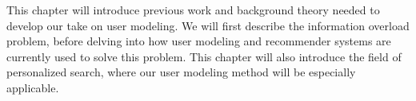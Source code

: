 \label{chap:theory}

This chapter will introduce previous work and background theory needed to develop our take on user modeling.
We will first describe the information overload problem, before delving into
how user modeling and recommender systems are currently used to solve this problem.
This chapter will also introduce the field of personalized search, 
where our user modeling method will be especially applicable.







 
%


